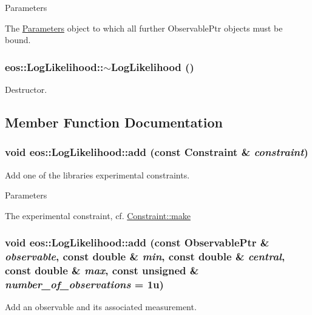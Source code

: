 \begin{DoxyParams}{Parameters}
\item[{\em parameters}]The \hyperlink{classeos_1_1Parameters}{Parameters} object to which all further ObservablePtr objects must be bound. \end{DoxyParams}
\hypertarget{classeos_1_1LogLikelihood_ad6f6ff2a71df17599e033681d64fe454}{
\subsubsection[{$\sim$LogLikelihood}]{\setlength{\rightskip}{0pt plus 5cm}eos::LogLikelihood::$\sim$LogLikelihood ()}}
\label{classeos_1_1LogLikelihood_ad6f6ff2a71df17599e033681d64fe454}
Destructor. 

\subsection{Member Function Documentation}
\hypertarget{classeos_1_1LogLikelihood_ac1fd5ffc7ace637eab0d8a3fa5cb7463}{
\subsubsection[{add}]{\setlength{\rightskip}{0pt plus 5cm}void eos::LogLikelihood::add (const {\bf Constraint} \& {\em constraint})}}
\label{classeos_1_1LogLikelihood_ac1fd5ffc7ace637eab0d8a3fa5cb7463}
Add one of the libraries experimental constraints.


\begin{DoxyParams}{Parameters}
\item[{\em constraint}]The experimental constraint, cf. \hyperlink{classeos_1_1Constraint_a5084265f8e196296a885089cf710c096}{Constraint::make} \end{DoxyParams}
\hypertarget{classeos_1_1LogLikelihood_a236d8123a08805e1d825ca262bada0c8}{
\subsubsection[{add}]{\setlength{\rightskip}{0pt plus 5cm}void eos::LogLikelihood::add (const {\bf ObservablePtr} \& {\em observable}, \/  const double \& {\em min}, \/  const double \& {\em central}, \/  const double \& {\em max}, \/  const unsigned \& {\em number\_\-of\_\-observations} = {\ttfamily 1u})}}
\label{classeos_1_1LogLikelihood_a236d8123a08805e1d825ca262bada0c8}
Add an observable and its associated measurement.


